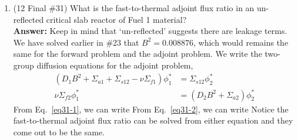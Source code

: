 \documentclass{school-22.211-notes}
\begin{document}
\begin{enumerate}
\item (12 Final \#31) What is the fast-to-thermal adjoint flux ratio in an un-reflected critical slab reactor of Fuel 1 material? \\
\textbf{Answer:} Keep in mind that `un-reflected' suggests there are leakage terms. We have solved earlier in \#23 that $B^2 = 0.008876$, which would remains the same for the forward problem and the adjoint problem. We write the two-group diffusion equations for the adjoint problem, 
\begin{align}
(D_1 B^2 + \Sigma_{a1} + \Sigma_{s12} - \nu \Sigma_{f1}) \phi_1^* &= \Sigma_{s12} \phi_2^* \label{eq31-1}\\
\nu \Sigma_{f2}\phi_1^* &=  (D_2 B^2 + \Sigma_{a2}) \phi_2^*  \label{eq31-2}
\end{align}
From Eq.~\ref{eq31-1}, we can write
From Eq.~\ref{eq31-2}, we can write
Notice the fast-to-thermal adjoint flux ratio can be solved from either equation and they come out to be the same. 

\end{enumerate}
\end{document}
